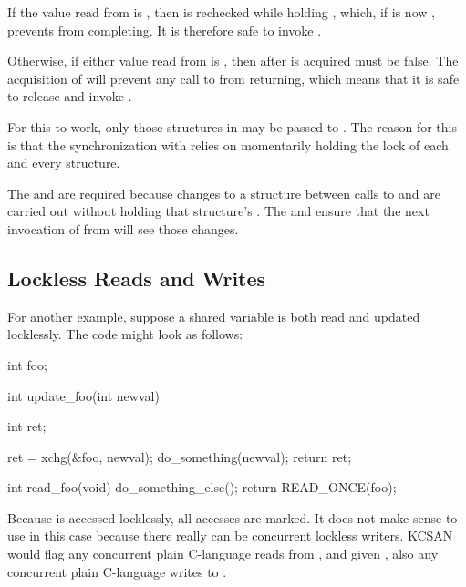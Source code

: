 If the value read from  is , then  is
rechecked while holding , which, if  is now ,
prevents  from completing.
It is therefore safe to invoke .

Otherwise, if either value read from  is , then after
 is acquired  must be false.
The acquisition of  will prevent any call to 
from returning, which means that it is safe to release 
and invoke .

For this to work, only those  structures in  may be
passed to .
The reason for this is that the synchronization with 
relies on momentarily holding the lock of each and every  structure.

The  and  are required because
changes to a  structure between calls to  and
 are carried out without holding that structure's .
The  and  ensure that the next
invocation of  from  will see those
changes.


\subsection{Lockless Reads and Writes}

For another example, suppose a shared variable  is both read and
updated locklessly.
The code might look as follows:

\begin{VerbatimU}
	int foo;

	int update_foo(int newval)
	{
		int ret;

		ret = xchg(&foo, newval);
		do_something(newval);
		return ret;
	}

	int read_foo(void)
	{
		do_something_else();
		return READ_ONCE(foo);
	}
\end{VerbatimU}

Because  is accessed locklessly, all accesses are marked.
It does not make sense to use  in this case
because there really can be concurrent lockless writers.
KCSAN would flag any concurrent plain C-language reads from , and
given , also any concurrent
plain C-language writes to .


